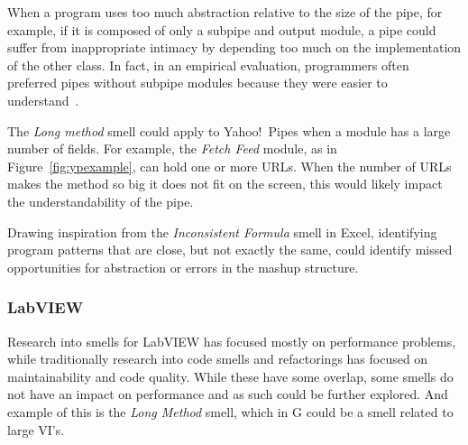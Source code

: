 \documentclass[10pt,conference,compsocconf]{IEEEtran}
\begin{document}
When a program uses too much abstraction relative to the size of the pipe, for example, if it is composed of only a subpipe and output module, a pipe could suffer from inappropriate intimacy by depending too much on the implementation of the other class. In fact, in an empirical evaluation, programmers often preferred pipes without subpipe modules because they were easier to understand~\cite{StoleeTSE2013}. 

The \emph{Long method} smell could apply to Yahoo!\ Pipes when a module has a large number of fields. For example, the \emph{Fetch Feed} module, as in Figure~\ref{fig:ypexample}, can hold one or more URLs. When the number of URLs makes the method so big it does not fit on the screen, this would likely impact the understandability of the pipe. 

Drawing inspiration from the \emph{Inconsistent Formula} smell in Excel, identifying program patterns that are close, but not exactly the same, could identify missed opportunities for abstraction or errors in the mashup structure. 

\subsubsection{LabVIEW}

Research into smells for LabVIEW has focused mostly on performance problems, while traditionally research into code smells and refactorings has focused on maintainability and code quality.
While these have some overlap, some smells do not have an impact on performance and as such could be further explored. And example of this is the \emph{Long Method} smell, which in G could be a smell related to large VI's.
\end{document}
